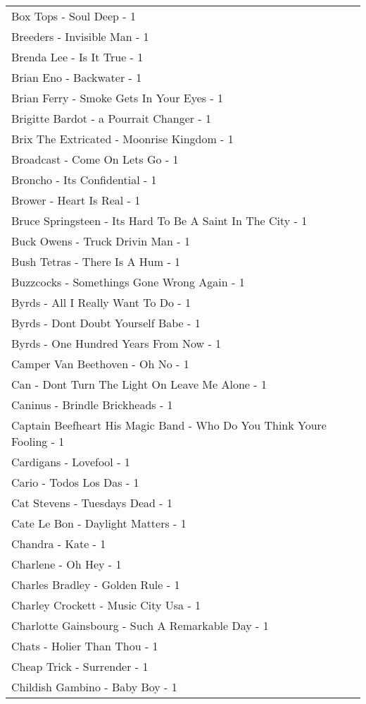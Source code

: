 \documentclass[
]{article}
\begin{document}
\begin{longtable}{l}
Box Tops - Soul Deep - 1 \\ 
Breeders - Invisible Man - 1 \\ 
Brenda Lee - Is It True - 1 \\ 
Brian Eno - Backwater - 1 \\ 
Brian Ferry - Smoke Gets In Your Eyes - 1 \\ 
Brigitte Bardot - a Pourrait Changer - 1 \\ 
Brix The Extricated - Moonrise Kingdom - 1 \\ 
Broadcast - Come On Lets Go - 1 \\ 
Broncho - Its Confidential - 1 \\ 
Brower - Heart Is Real - 1 \\ 
Bruce Springsteen - Its Hard To Be A Saint In The City - 1 \\ 
Buck Owens - Truck Drivin Man - 1 \\ 
Bush Tetras - There Is A Hum - 1 \\ 
Buzzcocks - Somethings Gone Wrong Again - 1 \\ 
Byrds - All I Really Want To Do - 1 \\ 
Byrds - Dont Doubt Yourself Babe - 1 \\ 
Byrds - One Hundred Years From Now - 1 \\ 
Camper Van Beethoven - Oh No - 1 \\ 
Can - Dont Turn The Light On Leave Me Alone - 1 \\ 
Caninus - Brindle Brickheads - 1 \\ 
Captain Beefheart His Magic Band - Who Do You Think Youre Fooling - 1 \\ 
Cardigans - Lovefool - 1 \\ 
Cario - Todos Los Das - 1 \\ 
Cat Stevens - Tuesdays Dead - 1 \\ 
Cate Le Bon - Daylight Matters - 1 \\ 
Chandra - Kate - 1 \\ 
Charlene - Oh Hey - 1 \\ 
Charles Bradley - Golden Rule - 1 \\ 
Charley Crockett - Music City Usa - 1 \\ 
Charlotte Gainsbourg - Such A Remarkable Day - 1 \\ 
Chats - Holier Than Thou - 1 \\ 
Cheap Trick - Surrender - 1 \\ 
Childish Gambino - Baby Boy - 1 \\ 

\end{longtable}
\end{document}

